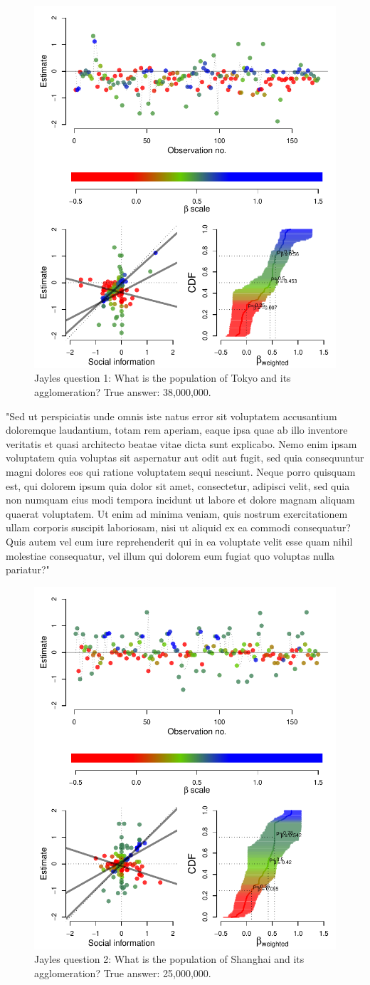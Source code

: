 \documentclass[9pt,twoside,lineno]{pnas-new}
\begin{document}
\begin{figure}[htbp]
	\centering\includegraphics[width=.5\textwidth]{../plots/jayles1.pdf}
	\caption{Jayles question 1: What is the population of Tokyo and its agglomeration? True answer: 38,000,000.}\label{fig: Jayles question 1}
\end{figure}

"Sed ut perspiciatis unde omnis iste natus error sit voluptatem accusantium doloremque laudantium, totam rem aperiam, eaque ipsa quae ab illo inventore veritatis et quasi architecto beatae vitae dicta sunt explicabo. Nemo enim ipsam voluptatem quia voluptas sit aspernatur aut odit aut fugit, sed quia consequuntur magni dolores eos qui ratione voluptatem sequi nesciunt. Neque porro quisquam est, qui dolorem ipsum quia dolor sit amet, consectetur, adipisci velit, sed quia non numquam eius modi tempora incidunt ut labore et dolore magnam aliquam quaerat voluptatem. Ut enim ad minima veniam, quis nostrum exercitationem ullam corporis suscipit laboriosam, nisi ut aliquid ex ea commodi consequatur? Quis autem vel eum iure reprehenderit qui in ea voluptate velit esse quam nihil molestiae consequatur, vel illum qui dolorem eum fugiat quo voluptas nulla pariatur?"

\begin{figure}[htbp]
	\centering\includegraphics[width=.5\textwidth]{../plots/jayles2.pdf}
	\caption{Jayles question 2: What is the population of Shanghai and its agglomeration? True answer: 25,000,000.}\label{fig: Jayles question 2}
\end{figure}
\end{document}
